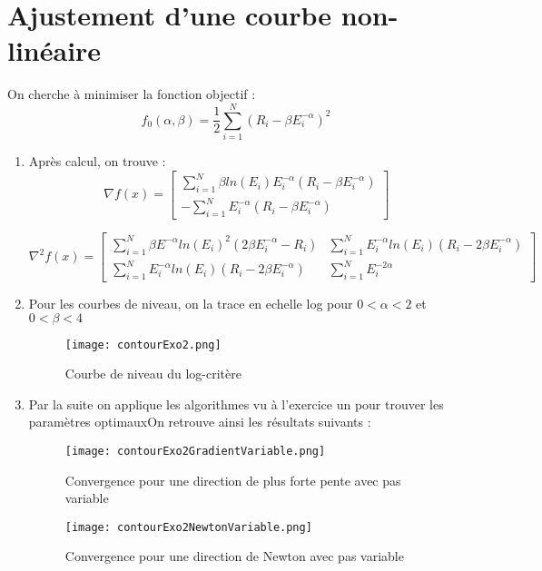 \documentclass[12pt,a4paper,titlepage]{article}
\begin{document}
\section{Ajustement d'une courbe non-linéaire}
	On cherche à minimiser la fonction objectif :	
	$$
		f_0( \alpha,\beta ) =  \frac{ 1}{2}  \sum_{i=1}^{N} ( R_i - \beta E_i^{-\alpha} )^2
	$$
\begin{enumerate}
    \item{
    	Après calcul, on trouve :
	$$
	\nabla f(x) = \left[
                \begin{array}{c}
                    \sum_{i=1}^{N} \beta ln(E_i)E_i^{-\alpha} (R_i-\beta E_i^{-\alpha} )\\
                     - \sum_{i=1}^{N} E_i^{-\alpha} (R_i-\beta E_i^{-\alpha})
                \end{array}
            \right]
	$$
	
	$$
	  \nabla ^2f(x)=\left[
                \begin{array}{cc}
                    \sum_{i=1}^{N} \beta E^{-\alpha} ln(E_i)^2 (2\beta E_i^{-\alpha}-R_i) &  \sum_{i=1}^{N} E_i^{-\alpha}ln(E_i) (R_i -2\beta E_i^{-\alpha}) \\
                    \sum_{i=1}^{N} E_i^{-\alpha}ln(E_i) (R_i -2\beta E_i^{-\alpha}) &  \sum_{i=1}^{N} E_i^{-2\alpha}
                \end{array}
            \right]
	$$
    }
    
    \item{
    Pour les courbes de niveau, on la trace en echelle log pour $ 0< \alpha < 2$ et $ 0 < \beta <4$
    	\begin{figure}[H]
                \centering
                \texttt{[image: contourExo2.png]}
                \caption{Courbe de niveau du log-critère}
            \end{figure}
    }
    
    \item{Par la suite on applique les algorithmes vu à l'exercice un pour trouver les paramètres optimauxOn retrouve ainsi les résultats suivants :
    	\begin{figure}[H]
                \centering
                \texttt{[image: contourExo2GradientVariable.png]}
                \caption{Convergence pour une direction de plus forte pente avec pas variable}
            \end{figure}
            
            \begin{figure}[H]
                \centering
                \texttt{[image: contourExo2NewtonVariable.png]}
                \caption{Convergence pour une direction de Newton avec pas variable}
            \end{figure}
            
}
\end{enumerate}
\end{document}
